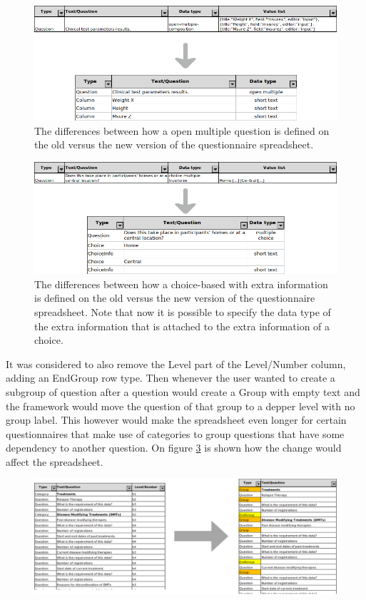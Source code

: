 \begin{figure}
    \center
    \includegraphics[width=.75\textwidth]{open-multiple-neu}
    \caption{The differences between how a open multiple question is defined on the old versus the new version of the questionnaire spreadsheet.}
    \label{fig:open-multiple-neu}
\end{figure}

\begin{figure}
    \center
    \includegraphics[width=.75\textwidth]{choice-neu}
    \caption{The differences between how a choice-based with extra information is defined on the old versus the new version of the questionnaire spreadsheet.
    Note that now it is possible to specify the data type of the extra information that is attached to the extra information of a choice.}
    \label{fig:choice-neu}
\end{figure}

It was considered to also remove the Level part of the Level/Number column, adding an EndGroup row type.
Then whenever the user wanted to create a subgroup of question after a question would create a Group with empty text and the framework would move the question of that group to a depper level with no group label.
This however would make the spreadsheet even longer for certain questionnaires that make use of categories to group questions that have some dependency to another question.
On figure \ref{fig:excel-end-group} is shown how the change would affect the spreadsheet.

\begin{figure}[h]
    \center
    \includegraphics[width=\textwidth]{excel-end-group}
    \caption{}
    \label{fig:excel-end-group}
\end{figure}

